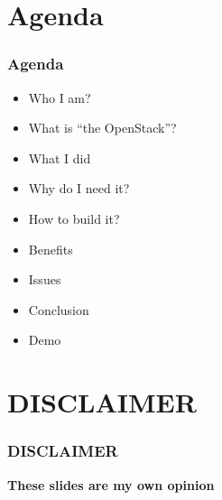 \documentclass[aspectratio=169,11pt,hyperref={colorlinks=true}]{beamer}
\begin{document}
\section{Agenda}
\begin{frame}
  \frametitle{Agenda}
  \begin{itemize}
    \item Who I am?
    \item What is ``the OpenStack''?
    \item What I did
    \item Why do I need it?
    \item How to build it?
    \item Benefits
    \item Issues
    \item Conclusion
    \item Demo
  \end{itemize}
\end{frame}

\section{DISCLAIMER}
\begin{frame}
  \frametitle{DISCLAIMER}
  \Huge{\bf{These slides are my own opinion}}
\end{frame}
\end{document}
